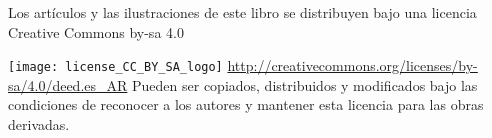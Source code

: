 \begin{center}
Los artículos y las ilustraciones de este libro se 
distribuyen bajo una licencia Creative Commons by-sa 4.0 
\newline

\texttt{[image: license\_CC\_BY\_SA\_logo]}
{\small 
\url{http://creativecommons.org/licenses/by-sa/4.0/deed.es_AR}
}
\newline
Pueden ser copiados, distribuidos y modificados bajo las condiciones 
de reconocer a los autores y mantener esta licencia para las obras derivadas.
\end{center}
